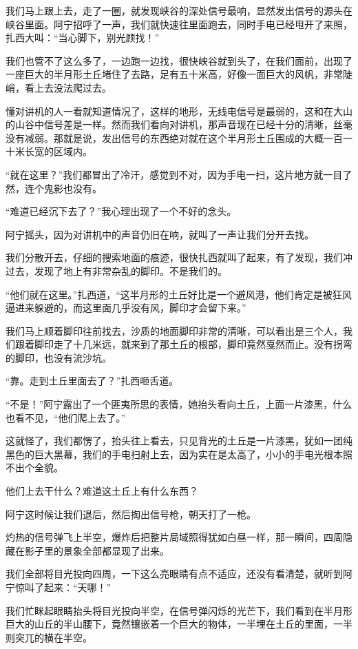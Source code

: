 我们马上跟上去，走了一圈，就发现峡谷的深处信号最响，显然发出信号的源头在峡谷里面。阿宁招呼了一声，我们就快速往里面跑去，同时手电已经甩开了来照，扎西大叫：“当心脚下，别光顾找！”

我们也管不了这么多了，一边跑一边找，很快峡谷就到头了，在我们面前，出现了一座巨大的半月形土丘堵住了去路，足有五十米高，好像一面巨大的风帆，非常陡峭，看上去没法爬过去。

懂对讲机的人一看就知道情况了，这样的地形，无线电信号是最弱的，这和在大山的山谷中信号差是一样。然而我们看向对讲机，那声音现在已经十分的清晰，丝毫没有减弱。那就是说，发出信号的东西绝对就在这个半月形土丘围成的大概一百一十米长宽的区域内。

“就在这里？”我们都冒出了冷汗，感觉到不对，因为手电一扫，这片地方就一目了然，连个鬼影也没有。

“难道已经沉下去了？”我心理出现了一个不好的念头。

阿宁摇头，因为对讲机中的声音仍旧在响，就叫了一声让我们分开去找。

我们分散开去，仔细的搜索地面的痕迹，很快扎西就叫了起来，有了发现，我们冲过去，发现了地上有非常杂乱的脚印。不是我们的。

“他们就在这里。”扎西道，“这半月形的土丘好比是一个避风港，他们肯定是被狂风逼进来躲避的，而这里面几乎没有风，脚印才会留下来。”

我们马上顺着脚印往前找去，沙质的地面脚印非常的清晰，可以看出是三个人，我们跟着脚印走了十几米远，就来到了那土丘的根部，脚印竟然戛然而止。没有拐弯的脚印，也没有流沙坑。

“靠。走到土丘里面去了？”扎西咂舌道。

“不是！”阿宁露出了一个匪夷所思的表情，她抬头看向土丘，上面一片漆黑，什么也看不见，“他们爬上去了。”

这就怪了，我们都愣了，抬头往上看去，只见背光的土丘是一片漆黑，犹如一团纯黑色的巨大黑幕，我们的手电扫射上去，因为实在是太高了，小小的手电光根本照不出个全貌。

他们上去干什么？难道这土丘上有什么东西？

阿宁这时候让我们退后，然后掏出信号枪，朝天打了一枪。

灼热的信号弹飞上半空，爆炸后把整片局域照得犹如白昼一样，那一瞬间，四周隐藏在影子里的景象全部都显现了出来。

我们全部将目光投向四周，一下这么亮眼睛有点不适应，还没有看清楚，就听到阿宁惊叫了起来：“天哪！”

我们忙眯起眼睛抬头将目光投向半空，在信号弹闪烁的光芒下，我们看到在半月形巨大的山丘的半山腰下，竟然镶嵌着一个巨大的物体，一半埋在土丘的里面，一半则突兀的横在半空。

